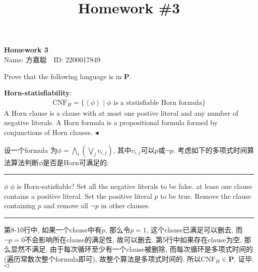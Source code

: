 \documentclass[11pt]{article}
\title{Homework \#3}
\makeatletter
\newenvironment{breakablealgorithm}
  {%
    \begin{center}
      \refstepcounter{algorithm}%
      \hrule height.8pt depth0pt \kern2pt%
      \parskip 0pt
      \renewcommand{\caption}[2][\relax]{%
        {\raggedright\textbf{\fname@algorithm~\thealgorithm} ##2\par}%
        \ifx\relax##1\relax %
          \addcontentsline{loa}{algorithm}{\protect\numberline{\thealgorithm}##2}%
        \else %
          \addcontentsline{loa}{algorithm}{\protect\numberline{\thealgorithm}##1}%
        \fi
        \kern2pt\hrule\kern2pt
     }
  }
  {%
     \kern2pt\hrule\relax%
   \end{center}
  }
\newcommand{\mP}{\mathbf{P}}
\newenvironment{problem}[2][Problem]{\begin{trivlist}
\item[\hskip \labelsep{\bfseries#1}\hskip\labelsep{\bfseries#2.}]}{\hfill$\blacktriangleleft$\end{trivlist}}
\newenvironment{answer}[1][Answer]{\begin{trivlist}
\item[\hskip \labelsep{\bfseries\itshape#1.}\hskip \labelsep]}{\hfill$\lhd$\end{trivlist}}
\makeatother
\begin{document}
\kaishu

\pagestyle{fancy}
\chead{}

\begin{center}
    {\LARGE \bf Homework 3}\\
    {Name: 方嘉聪\ \  ID: 2200017849}            %
\end{center}

\begin{problem}{1.(18 points)}
    Prove that the following language is in $\mP$.

    \textbf{Horn-statisfiability}:
    \begin{align*}
        \text{CNF}_H = \{ \left\langle\phi\right\rangle \mid \phi \text{ is a statisfiable Horn formula}\}
    \end{align*}
    A Horn clause is a clause with at most one postive literal and any number of negative literals. A Horn formula is a propositional formula formed by conjunctions of Horn clauses.
\end{problem}
\begin{answer}
    设一个formula 为$\phi = \bigwedge_i\left(\bigvee_j v_{i,j}\right)$, 其中$v_{i,j}$可以$p$或$\neg p$. 考虑如下的多项式时间算法算法判断$\phi$是否是Horn可满足的:
    \begin{breakablealgorithm}
        \centering
        \begin{algorithmic}[1]
            \Require $\phi$
            \Ensure $\phi$ is Horn-satisfiable?
            \State Set all the negative literals to be false. 
            \State {}
            \State {}
            \Else 
            \State at lease one clause contains a positive literal.
            \State Set the positive literal $p$ to be true. 
            \State Remove the clause containing $p$ and remove all $\neg p$ in other clauses.
            \EndIf
            \EndWhile
            \State {}
        \end{algorithmic}
    \end{breakablealgorithm}
    第8-10行中, 如果一个clause中有$p$, 那么令$p = 1$, 这个clause已满足可以删去, 而$\neg p = 0$不会影响所在clause的满足性, 故可以删去. 第5行中如果存在clause为空, 那么显然不满足. 由于每次循环至少有一个clause被删除, 而每次循环是多项式时间的(遍历常数次整个formula即可), 故整个算法是多项式时间的. 所以$\text{CNF}_H \in \mP$. 证毕.
\end{answer}
\end{document}
